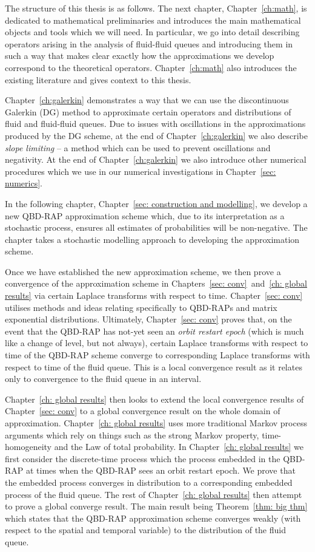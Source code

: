 The structure of this thesis is as follows. The next chapter, Chapter~\ref{ch:math}, is dedicated to mathematical preliminaries and introduces the main mathematical objects and tools which we will need. In particular, we go into detail describing operators arising in the analysis of fluid-fluid queues and introducing them in such a way that makes clear exactly how the approximations we develop correspond to the theoretical operators. Chapter~\ref{ch:math} also introduces the existing literature and gives context to this thesis.

Chapter~\ref{ch:galerkin} demonstrates a way that we can use the discontinuous Galerkin (DG) method to approximate certain operators and distributions of fluid and fluid-fluid queues. Due to issues with oscillations in the approximations produced by the DG scheme, at the end of Chapter~\ref{ch:galerkin} we also describe \emph{slope limiting} -- a method which can be used to prevent oscillations and negativity. At the end of Chapter~\ref{ch:galerkin} we also introduce other numerical procedures which we use in our numerical investigations in Chapter~\ref{sec: numerics}.

In the following chapter, Chapter~\ref{sec: construction and modelling}, we develop a new QBD-RAP approximation scheme which, due to its interpretation as a stochastic process, ensures all estimates of probabilities will be non-negative. The chapter takes a stochastic modelling approach to developing the approximation scheme. 

Once we have established the new approximation scheme, we then prove a convergence of the approximation scheme in Chapters~\ref{sec: conv}~and~\ref{ch: global results} via certain Laplace transforms with respect to time. Chapter~\ref{sec: conv} utilises methods and ideas relating specifically to QBD-RAPs and matrix exponential distributions. Ultimately, Chapter~\ref{sec: conv} proves that, on the event that the QBD-RAP has not-yet seen an \emph{orbit restart epoch} (which is much like a change of level, but not always), certain Laplace transforms with respect to time of the QBD-RAP scheme converge to corresponding Laplace transforms with respect to time of the fluid queue. This is a local convergence result as it relates only to convergence to the fluid queue in an interval. 

Chapter~\ref{ch: global results} then looks to extend the local convergence results of Chapter~\ref{sec: conv} to a global convergence result on the whole domain of approximation. Chapter~\ref{ch: global results} uses more traditional Markov process arguments which rely on things such as the strong Markov property, time-homogeneity and the Law of total probability. In Chapter~\ref{ch: global results} we first consider the discrete-time process which the process embedded in the QBD-RAP at times when the QBD-RAP sees an orbit restart epoch. We prove that the embedded process converges in distribution to a corresponding embedded process of the fluid queue. The rest of Chapter~\ref{ch: global results} then attempt to prove a global converge result. The main result being Theorem~\ref{thm: big thm} which states that the QBD-RAP approximation scheme converges weakly (with respect to the spatial and temporal variable) to the distribution of the fluid queue. 

